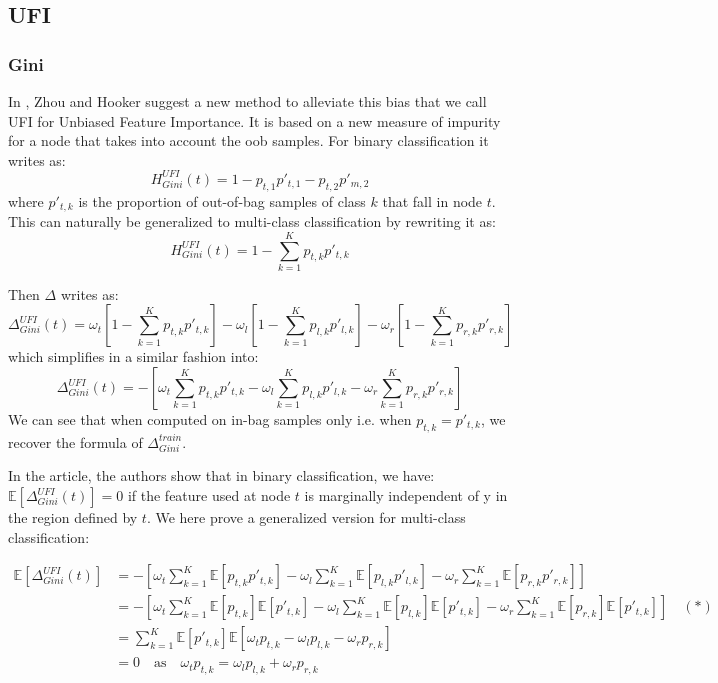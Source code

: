 \documentclass{article}
\begin{document}
\subsection{UFI}
\subsubsection{Gini}
In \cite{UFI}, Zhou and Hooker suggest a new method to alleviate this bias that we call UFI for Unbiased Feature Importance. It is based on a new measure of impurity for a node that takes into account the oob samples. For binary classification it writes as:
\[ 
H^{UFI}_{Gini}(t) = 1 - p_{t,1}p'_{t,1} - p_{t,2}p'_{m,2}
\] 
where $p'_{t,k}$ is the proportion of out-of-bag samples of class $k$ that fall in node $t$. This can naturally be generalized to multi-class classification by rewriting it as:
\[
H^{UFI}_{Gini}(t) = 1 - \sum_{k=1}^{K} p_{t,k}p'_{t,k}
\] 

Then $\Delta$ writes as:
\[
\Delta_{Gini}^{UFI} (t) = \omega_t \left[1 - \sum_{k = 1}^K p_{t,k}p'_{t,k}\right] - \omega_{l} \left[1 - \sum_{k = 1}^K p_{l,k}p'_{l,k}\right] - \omega_{r} \left[1 - \sum_{k = 1}^K p_{r,k}p'_{r,k}\right]
\] 
which simplifies in a similar fashion into:
\[
\Delta_{Gini}^{UFI} (t) = - \left[\omega_t \sum_{k = 1}^K p_{t,k}p'_{t,k} - \omega_{l} \sum_{k = 1}^K p_{l,k}p'_{l,k} - \omega_{r} \sum_{k = 1}^K p_{r,k}p'_{r,k}\right]
\] 
We can see that when computed on in-bag samples only i.e. when $p_{t,k} = p'_{t,k}$, we recover the formula of $\Delta_{Gini}^{train}$.

In the article, the authors show that in binary classification, we have: $\mathbb{E}[\Delta_{Gini}^{UFI} (t)] = 0$ if the feature used at node $t$ is marginally independent of y in the region defined by $t$. We here prove a generalized version for multi-class classification:

\begin{align*}
    \mathbb{E}[\Delta_{Gini}^{UFI} (t)] &= - \left[\omega_t \sum_{k = 1}^K \mathbb{E}[p_{t,k}p'_{t,k}] - \omega_{l} \sum_{k = 1}^K \mathbb{E}[p_{l,k}p'_{l,k}] - \omega_{r} \sum_{k = 1}^K \mathbb{E}[p_{r,k}p'_{r,k}]\right] \\
    &= - \left[\omega_t \sum_{k = 1}^K \mathbb{E}[p_{t,k}] \mathbb{E}[p'_{t,k}] - \omega_{l} \sum_{k = 1}^K \mathbb{E}[p_{l,k}] \mathbb{E}[p'_{t,k}] - \omega_{r} \sum_{k = 1}^K \mathbb{E}[p_{r,k}] \mathbb{E}[p'_{t,k}]\right] \quad (*) \\
    &= \sum_{k=1}^K \mathbb{E}[p'_{t,k}] \mathbb{E}[ \omega_t p_{t,k} - \omega_l p_{l,k} - \omega_r p_{r,k} ]  \\
    &= 0 \quad \text{as} \quad \omega_t p_{t,k} =  \omega_l p_{l,k} + \omega_r p_{r,k}
\end{align*}
\end{document}
